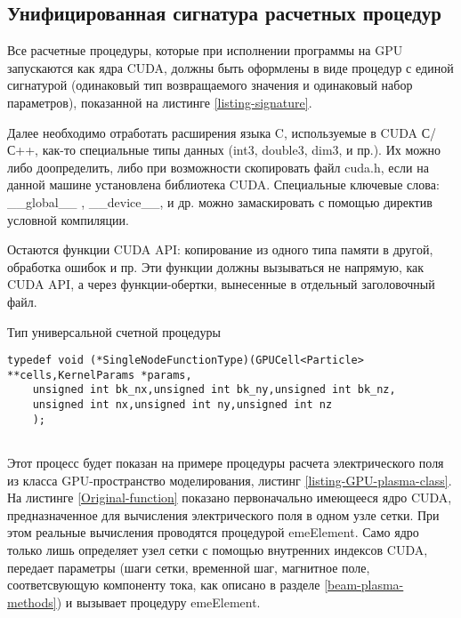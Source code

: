 \subsection{Унифицированная сигнатура расчетных процедур}
Все расчетные процедуры, которые при исполнении программы на GPU запускаются как ядра CUDA, должны быть оформлены в виде процедур с единой сигнатурой (одинаковый тип возвращаемого значения и одинаковый набор параметров), показанной на листинге \ref{listing-signature}.

Далее необходимо отработать расширения языка C, используемые в CUDA С/С++, как-то специальные типы данных
(int3, double3, dim3, и пр.). Их можно либо доопределить, либо при возможности скопировать файл cuda.h, если на данной машине установлена библиотека CUDA. Специальные ключевые слова: \_\_global\_\_ ,         \_\_device\_\_, и др. можно 
замаскировать с помощью директив условной компиляции.

Остаются функции CUDA API: копирование из одного типа памяти в другой, обработка ошибок и пр. Эти функции должны вызываться не напрямую, как CUDA API, а через функции-обертки, вынесенные в отдельный заголовочный файл.

\begin{ListingEnv}[!h]
	\captiondelim{ } %
\caption{Тип универсальной счетной процедуры}
\label{listing-signature}
	\begin{lstlisting}[language={[ISO]C++}]
	typedef void (*SingleNodeFunctionType)(GPUCell<Particle>  **cells,KernelParams *params,
	unsigned int bk_nx,unsigned int bk_ny,unsigned int bk_nz,
	unsigned int nx,unsigned int ny,unsigned int nz
	);
	
	\end{lstlisting}
\end{ListingEnv}

Этот процесс будет показан на примере процедуры расчета электрического поля из класса GPU-пространство моделирования, листинг \ref{listing-GPU-plasma-class}. На листинге \ref{Original-function} показано первоначально имеющееся ядро CUDA, предназначенное для вычисления электрического поля в одном узле сетки. При этом реальные вычисления проводятся процедурой emeElement. Само ядро только лишь определяет узел сетки с помощью внутренних индексов CUDA, передает параметры (шаги сетки, временной шаг, магнитное поле, соответсвующую компоненту тока, как описано в разделе \ref{beam-plasma-methods}) и вызывает процедуру emeElement.


